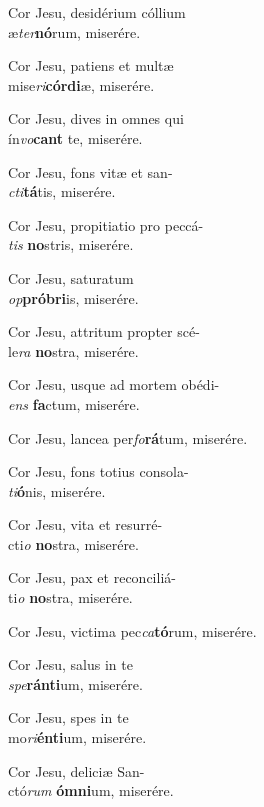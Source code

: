 \noindent Cor Jesu, desidérium cóllium
 \\ \emspace æ\tinyhspace\textit{ter}\textbf{nó}rum, \hfill miserére.

\noindent Cor Jesu, patiens et multæ 
 \\ \emspace mise\textit{ri}\tinyhspace\textbf{córdi}æ, \hfill miserére. 

\noindent Cor Jesu, dives in o\-mnes qui 
 \\ \emspace ín\textit{vo}\textbf{cant} te, \hfill miserére.

\noindent Cor Jesu, fons vitæ et san-
 \\ \emspace \textit{cti}\textbf{tá}tis, \hfill miserére.

\noindent Cor Jesu, propitiatio pro peccá-
 \\ \emspace \textit{tis} \textbf{no}stris, \hfill miserére.

\noindent Cor Jesu, saturatum  \\ \emspace \textit{op}\textbf{próbri}is, \hfill miserére.

\noindent Cor Jesu, attritum pro\-pter scé-
 \\ \emspace le\tinyhspace\textit{ra} \textbf{no}stra, \hfill miserére.

\noindent Cor Jesu, usque ad mortem obédi-
 \\ \emspace \textit{ens} \textbf{fa}ctum, \hfill miserére.

\noindent Cor Jesu, lancea per\textit{fo}\textbf{rá}tum, \hfill miserére.

\noindent Cor Jesu, fons totius consola-
 \\ \emspace \textit{ti}\textbf{ó}nis, \hfill miserére.

\noindent Cor Jesu, vita et resurré-
 \\ \emspace cti\tinyhspace\textit{o} \textbf{no}stra, \hfill miserére.

\noindent Cor Jesu, pax et reconciliá-
 \\ \emspace ti\tinyhspace\textit{o} \textbf{no}stra, \hfill miserére.

\noindent Cor Jesu, victima pec\tinyhspace\textit{ca}\textbf{tó}rum, \hfill miserére.

\noindent Cor Jesu, salus in te 
 \\ \emspace \textit{spe}\textbf{ránti}um, \hfill miserére.

\noindent Cor Jesu, spes in te 
 \\ \emspace mo\textit{ri}\textbf{énti}um, \hfill miserére.

\noindent Cor Jesu, deliciæ San-
 \\ \emspace ctó\textit{rum} \textbf{ómni}um, \hfill miserére.